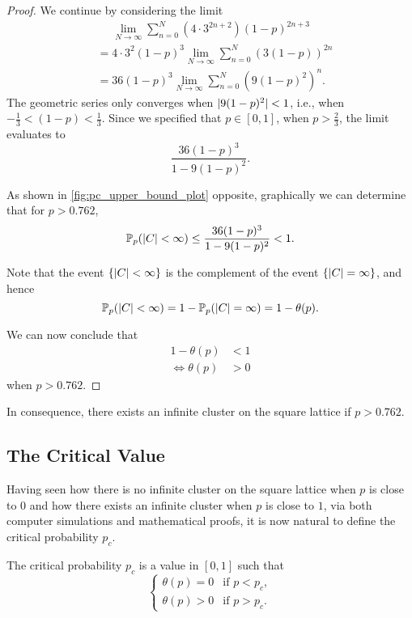 \documentclass[a4paper, 12pt]{article}
\begin{document}
\begin{proof}
We continue by considering the limit
\begin{align*}
    &\phantom{=}\lim_{N \to \infty} \sum_{n = 0}^N (4 \cdot 3^{2n + 2}) (1 - p)^{2n + 3}\\
    &= 4 \cdot 3^2 (1 - p)^3 \lim_{N \to \infty} \sum_{n = 0}^N \left(3 (1 - p)\right)^{2n}\\
    &= 36 (1 - p)^3 \lim_{N \to \infty} \sum_{n = 0}^N \left(9 (1 - p)^2\right)^n.
\end{align*}
The geometric series only converges when $\lvert 9 (1 - p)^2 \rvert < 1$, i.e., when $-\frac{1}{3} < (1 - p) < \frac{1}{3}$. Since we specified that $p \in \left[0, 1\right]$, when $p > \frac{2}{3}$, the limit evaluates to
\[
    \frac{36 (1 - p)^3}{1 - 9 (1 - p)^2}.
\]



As shown in \cref{fig:pc_upper_bound_plot} opposite, graphically we can determine that for $p > 0.762$, \[\mathbb{P}_p(\lvert C \rvert < \infty) \leq \frac{36(1 - p)^3}{1 - 9(1 - p)^2} < 1.\]

Note that the event $\{\lvert C \rvert < \infty\}$ is the complement of the event $\{\lvert C \rvert = \infty\}$, and hence
\[
    \mathbb{P}_p(\lvert C \rvert < \infty) = 1 - \mathbb{P}_p(\lvert C \rvert = \infty) = 1 - \theta(p).
\]

We can now conclude that
\begin{align*}
    1 - \theta(p) &< 1\\
    \iff \theta(p) &> 0
\end{align*}
when $p > 0.762$.
\end{proof}

In consequence, there exists an infinite cluster on the square lattice if $p > 0.762$.

\subsection{The Critical Value}\label{subsec:pc}
Having seen how there is no infinite cluster on the square lattice when $p$ is close to $0$ and how there exists an infinite cluster when $p$ is close to $1$, via both computer simulations and mathematical proofs, it is now natural to define the critical probability $p_c$.

\begin{defn}\label{defn:pc}
The critical probability $p_c$ is a value in $\left[0, 1\right]$ such that
\[
\begin{cases}
\theta(p) = 0 &\text{if } p < p_c,\\
\theta(p) > 0 &\text{if } p > p_c.
\end{cases}
\]
\end{defn}
\end{document}
